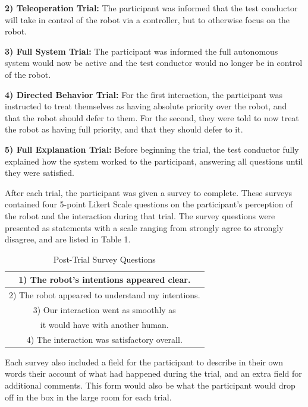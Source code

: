 \documentclass[letterpaper, 10 pt, conference]{ieeeconf}  %
\begin{document}
\textbf{2) Teleoperation Trial:} The participant was informed that the test conductor will take in control of the robot via a controller, but to otherwise focus on the robot. 

\textbf{3) Full System Trial:} The participant was informed the full autonomous system would now be active and the test conductor would no longer be in control of the robot.

\textbf{4) Directed Behavior Trial:} For the first interaction, the participant was instructed to treat themselves as having absolute priority over the robot, and that the robot should defer to them. For the second, they were told to now treat the robot as having full priority, and that they should defer to it.

\textbf{5) Full Explanation Trial:} Before beginning the trial, the test conductor fully explained how the system worked to the participant, answering all questions until they were satisfied.

After each trial, the participant was given a survey to complete. These surveys contained four 5-point Likert Scale questions on the participant’s perception of the robot and the interaction during that trial. The survey questions were presented as statements with a scale ranging from strongly agree to strongly disagree, and are listed in Table 1.

\begin{table}[h]
\caption{Post-Trial Survey Questions}
\label{survey_questions}
\begin{center}
\begin{tabular}{|c|}
\hline
1) The robot’s intentions appeared clear.\\
\hline
2) The robot appeared to understand my intentions.\\
\hline
3) Our interaction went as smoothly as \\
it would have with another human.\\
\hline
4) The interaction was satisfactory overall.\\
\hline
\end{tabular}
\end{center}
\end{table}

Each survey also included a field for the participant to describe in their own words their account of what had happened during the trial, and an extra field for additional comments. This form would also be what the participant would drop off in the box in the large room for each trial.
\end{document}

